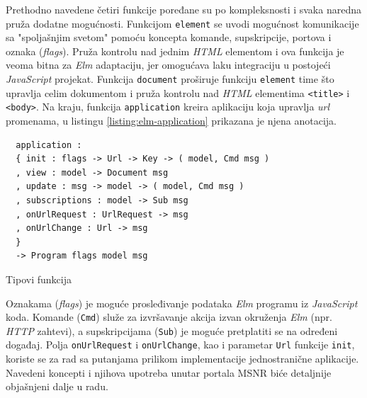 \documentclass[12pt,oneside]{memoir}
\begin{document}
Prethodno navedene četiri funkcije poređane su po kompleksnosti i svaka naredna pruža dodatne mogućnosti.
Funkcijom \texttt{element} se uvodi mogućnost komunikacije sa "spoljašnjim svetom" pomoću koncepta komande, supskripcije, portova
i oznaka (\emph{flags}). Pruža kontrolu nad jednim \emph{HTML} elementom i ova funkcija je veoma bitna za \emph{Elm} adaptaciju,
jer omogućava laku integraciju u postojeći \emph{JavaScript} projekat. 
Funkcija \texttt{document} proširuje funkciju \texttt{element} time što upravlja celim dokumentom i pruža kontrolu nad \emph{HTML} elementima \texttt{<title>}
i \texttt{<body>}. Na kraju, funkcija \texttt{application} kreira aplikaciju koja upravlja \emph{url} promenama, u listingu
\ref{listing:elm-application} prikazana je njena anotacija. 
\begin{listing}[h]
\begin{verbatim}
  application :
  { init : flags -> Url -> Key -> ( model, Cmd msg )
  , view : model -> Document msg
  , update : msg -> model -> ( model, Cmd msg )
  , subscriptions : model -> Sub msg
  , onUrlRequest : UrlRequest -> msg
  , onUrlChange : Url -> msg
  }
  -> Program flags model msg
\end{verbatim}
\caption{Tipovi funkcija}
\label{listing:elm-application}
\end{listing} 

Oznakama (\emph{flags}) je moguće prosleđivanje podataka \emph{Elm} programu iz \emph{JavaScript} koda.
Komande (\texttt{Cmd}) služe za izvršavanje akcija izvan okruženja \emph{Elm} (npr. \emph{HTTP} zahtevi), a supskripcijama
(\texttt{Sub}) je moguće pretplatiti se na određeni događaj. Polja \texttt{onUrlRequest} i \texttt{onUrlChange}, kao i
parametar \texttt{Url} funkcije \texttt{init}, koriste se za rad sa putanjama prilikom implementacije jednostranične aplikacije.
Navedeni koncepti i njihova upotreba unutar portala MSNR biće detaljnije objašnjeni dalje u radu.
\end{document}
